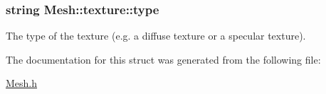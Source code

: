 \subsubsection[{\texorpdfstring{type}{type}}]{\setlength{\rightskip}{0pt plus 5cm}string Mesh\+::texture\+::type}\hypertarget{structMesh_1_1texture_a69224b22e2c2d7f180c333adbe163655}{}\label{structMesh_1_1texture_a69224b22e2c2d7f180c333adbe163655}
The type of the texture (e.\+g. a diffuse texture or a specular texture). 

The documentation for this struct was generated from the following file\+:\begin{DoxyCompactItemize}
\item 
\hyperlink{Mesh_8h}{Mesh.\+h}\end{DoxyCompactItemize}
